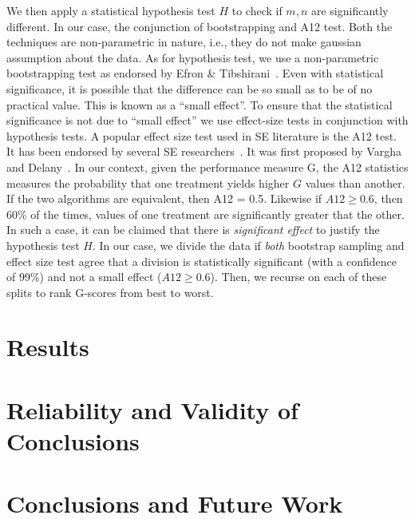 \documentclass[sigconf, proceedings, 9pt]{acmart}
\begin{document}
We then apply a statistical hypothesis test $H$ to check
if $m,n$ are significantly different. In our case, the conjunction of 
bootstrapping and A12 test. Both the techniques are non-parametric in nature, 
i.e., they do not make gaussian assumption about the data. As for hypothesis 
test, we use a non-parametric bootstrapping test as endorsed by Efron \& 
Tibshirani~\cite[p220-223]{efron93}. Even with statistical significance, it is 
possible that the difference
	can be so small as to be of no practical value. This is known as a ``small 
	effect''. To ensure that the statistical significance is not due to ``small 
	effect'' we use effect-size tests in conjunction with hypothesis tests. A 
	popular effect size test used in SE literature is the A12 test. It has been 
	endorsed by several SE researchers~\cite{leech2002call, poulding10, arcuri11, 
	shepperd12a, kampenes07, Kocaguneli2013:ep}. It was first proposed by Vargha 
	and Delany~\cite{vargha2000}. In our context,
	given the performance measure 
	G, the A12 statistics measures the
	probability that one treatment yields higher $G$ values than another. If the 
	two algorithms are equivalent, then A12 = 0.5. Likewise if $A12 \ge 0.6$, then 
	60\% of the times, values of one treatment are significantly greater that the 
	other. In such a case, it can be claimed that there is \textit{significant 
	effect} to justify the hypothesis test $H$. In our case, we divide the data if 
	\textit{both} bootstrap sampling and effect size test agree that a division is 
	statistically significant (with a
	confidence of 99\%) and not a small effect ($A12 \ge 0.6$). Then, we recurse 
	on each of these splits to rank G-scores from best to worst.



\section{Results}
\label{sect:results}

	\section{Reliability and Validity of Conclusions}

\section{Conclusions and Future Work}
\label{sect:conclusion}

\label{sect:valid}
\end{document}
